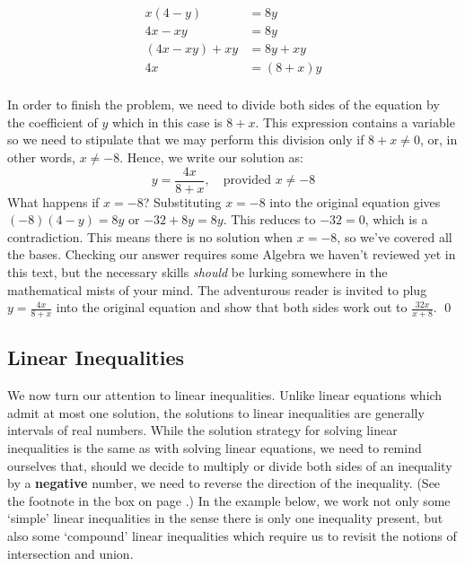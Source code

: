 \begin{ex}
\begin{enumerate}
\begin{align*}
x(4-y) & = 8y \\
4x - xy & = 8y \tag{Distribute} \\
(4x - xy) + xy & = 8y + xy \tag{Add $xy$} \\
4x & = (8+x)y \tag{Factor} \\
\end{align*}

In order to finish the problem, we need to divide both sides of the equation by the coefficient of $y$ which in this case is $8+x$.  This expression contains a variable so we need to stipulate that we may perform this division only if $8 + x \neq 0$, or, in other words, $x \neq -8$.  Hence, we write our solution as:\[ y = \dfrac{4x}{8+x}, \quad \text{provided $x \neq -8$}\] What happens if $x = -8$?  Substituting $x = -8$ into the original equation gives $(-8)(4-y) = 8y$ or $-32 + 8y = 8y$.  This reduces to $-32 = 0$, which is a contradiction.  This means there is no solution when $x = -8$, so we've covered all the bases.  Checking our answer requires some Algebra we haven't reviewed yet in this text, but the necessary skills \emph{should} be lurking somewhere in the mathematical mists of your mind.  The adventurous reader is invited to plug $y = \frac{4x}{8 + x}$ into the original equation and show that both sides work out to $\frac{32x}{x + 8}$. \qed

\end{enumerate}

\end{ex}

\subsection{Linear Inequalities}
\label{LinearInequal}

We now turn our attention to linear inequalities.  Unlike linear equations which admit at most one solution, the solutions to linear inequalities are generally intervals of real numbers.  While the solution strategy for solving linear inequalities is the same as with solving linear equations, we need to remind ourselves that, should we decide to multiply or divide both sides of an inequality by a \textbf{negative} number, we need to reverse the direction of the inequality. (See the footnote in the box on page \pageref{box:equivalenteqnineq}.)  In the example below, we work not only some `simple' linear inequalities in the sense there is only one inequality present, but also some `compound' linear inequalities which require us to revisit the notions of intersection and union. 

